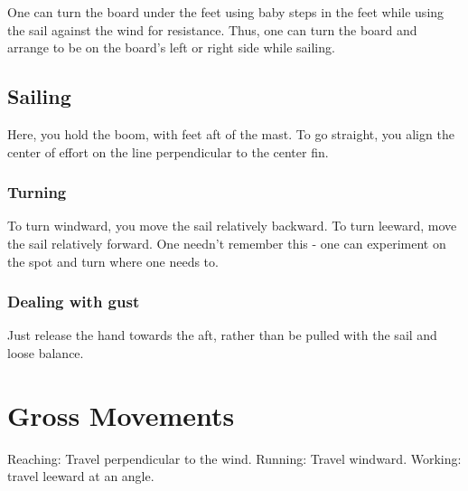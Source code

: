 \documentclass[oneside, article]{memoir}
\begin{document}
One can turn the board under the feet using baby steps in the feet while using the sail against the wind for resistance. Thus, one can turn the board and arrange to be on the board's left or right side while sailing.

\subsection{Sailing}
Here, you hold the boom, with feet aft of the mast. To go straight, you align the center of effort on the line perpendicular to the center fin.

\subsubsection{Turning}
To turn windward, you move the sail relatively backward. To turn leeward, move the sail relatively forward. One needn't remember this - one can experiment on the spot and turn where one needs to.

\subsubsection{Dealing with gust}
Just release the hand towards the aft, rather than be pulled with the sail and loose balance.

\section{Gross Movements}
Reaching: Travel perpendicular to the wind. Running: Travel windward. Working: travel leeward at an angle.
\end{document}
